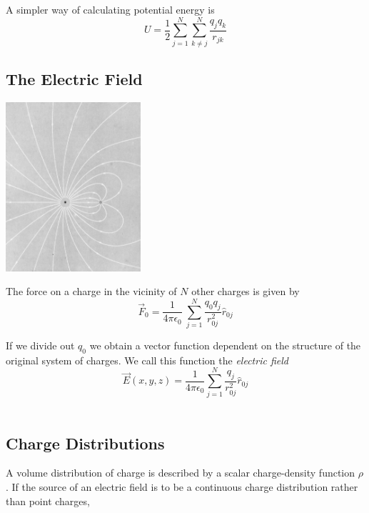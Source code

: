 \documentclass[svgnames]{article}
\begin{document}
A simpler way of calculating potential energy is \\

\[ U = \frac{1}{2}\sum_{j=1}^N \sum_{k\neq j}^N \frac{q_jq_k}{r_{jk}} \]

\subsection{The Electric Field} 

\vspace{20px}

\begin{center}
\includegraphics[width = 50mm]{ss7.png}
\end{center} 


\vspace{20px}

The force on a charge in the vicinity of $N$ other charges is given by \\ 

\[ \vec{F}_0 = \frac{1}{4\pi\epsilon_0} \ \sum_{j=1}^N \frac{q_0q_j}{r_{0j}^2}\hat{r}_{0j} \]

If we divide out $q_0$ we obtain a vector function dependent on the structure of the original system of charges. We call this function the \textit{electric field} \\ 

\[ \vec{E}(x,y,z) = \frac{1}{4\pi\epsilon_0}\sum_{j=1}^N \frac{q_j}{r_{0j}^2}\hat{r}_{0j} \] \\


\subsection{Charge Distributions} 

A volume distribution of charge is described by a scalar charge-density function $\rho$. If the source of an electric field is to be a continuous charge distribution rather than point charges, \\
\end{document}
